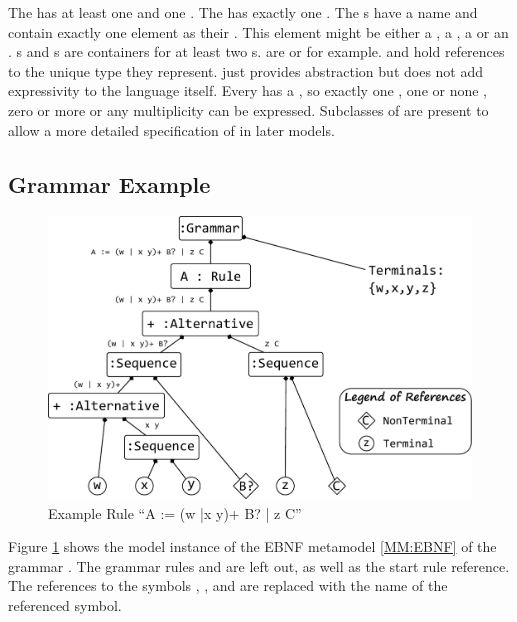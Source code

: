 The  has at least one  and one . The  has exactly one . The s have a name and contain exactly one element as their . This element might be either a , a , a  or an . s and s are containers for at least two s.  are  or  for example.  and  hold references to the unique type they represent.  just provides abstraction but does not add expressivity to the language itself. Every  has a , so exactly one , one or none , zero or more \code{+} or any multiplicity \code{*} can be expressed. Subclasses of  are present to allow a more detailed specification of  in later models.



\subsection{Grammar Example}
\begin{figure}
\centering
\includegraphics[scale=0.7]{gfx/ex/grammarExample} 
\caption{Example Rule ``A := (w |x y)+ B? | z C''}
\label{MM:GrammarExample}
\end{figure}
Figure \ref{MM:GrammarExample} shows the model instance of the EBNF metamodel \ref{MM:EBNF} of the grammar  . The grammar rules  and  are left out, as well as the start rule reference. The references to the symbols , ,  and  are replaced with the name of the referenced symbol.

